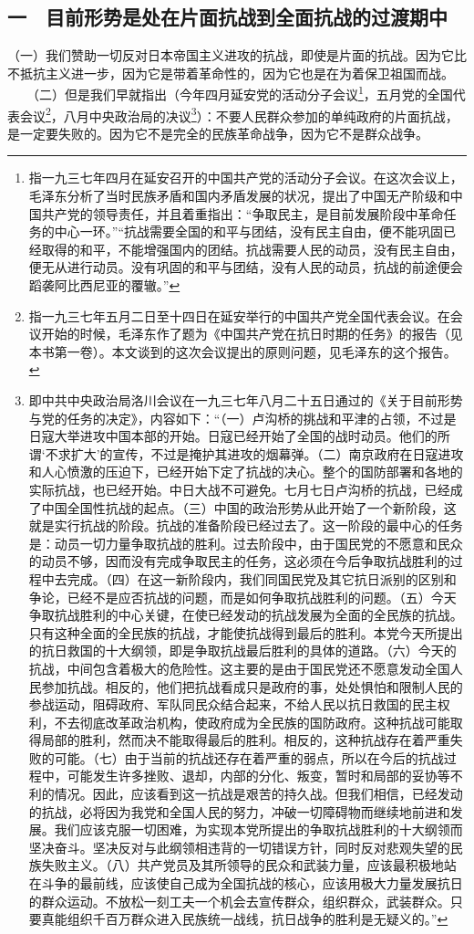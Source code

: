 \documentclass[cn,11pt,chinese]{elegantbook}
\def\myformat#1{\hfil\hfil #1}
\begin{document}
\subsection*{\myformat{一　目前形势是处在片面抗战到全面抗战的过渡期中}}
（一）我们赞助一切反对日本帝国主义进攻的抗战，即使是片面的抗战。因为它比不抵抗主义进一步，因为它是带着革命性的，因为它也是在为着保卫祖国而战。\\
　　（二）但是我们早就指出（今年四月延安党的活动分子会议\footnote[1]{ 指一九三七年四月在延安召开的中国共产党的活动分子会议。在这次会议上，毛泽东分析了当时民族矛盾和国内矛盾发展的状况，提出了中国无产阶级和中国共产党的领导责任，并且着重指出：“争取民主，是目前发展阶段中革命任务的中心一环。”“抗战需要全国的和平与团结，没有民主自由，便不能巩固已经取得的和平，不能增强国内的团结。抗战需要人民的动员，没有民主自由，便无从进行动员。没有巩固的和平与团结，没有人民的动员，抗战的前途便会蹈袭阿比西尼亚的覆辙。”}，五月党的全国代表会议\footnote[2]{ 指一九三七年五月二日至十四日在延安举行的中国共产党全国代表会议。在会议开始的时候，毛泽东作了题为《中国共产党在抗日时期的任务》的报告（见本书第一卷）。本文谈到的这次会议提出的原则问题，见毛泽东的这个报告。}，八月中央政治局的决议\footnote[3]{ 即中共中央政治局洛川会议在一九三七年八月二十五日通过的《关于目前形势与党的任务的决定》，内容如下：“（一）卢沟桥的挑战和平津的占领，不过是日寇大举进攻中国本部的开始。日寇已经开始了全国的战时动员。他们的所谓‘不求扩大’的宣传，不过是掩护其进攻的烟幕弹。（二）南京政府在日寇进攻和人心愤激的压迫下，已经开始下定了抗战的决心。整个的国防部署和各地的实际抗战，也已经开始。中日大战不可避免。七月七日卢沟桥的抗战，已经成了中国全国性抗战的起点。（三）中国的政治形势从此开始了一个新阶段，这就是实行抗战的阶段。抗战的准备阶段已经过去了。这一阶段的最中心的任务是：动员一切力量争取抗战的胜利。过去阶段中，由于国民党的不愿意和民众的动员不够，因而没有完成争取民主的任务，这必须在今后争取抗战胜利的过程中去完成。（四）在这一新阶段内，我们同国民党及其它抗日派别的区别和争论，已经不是应否抗战的问题，而是如何争取抗战胜利的问题。（五）今天争取抗战胜利的中心关键，在使已经发动的抗战发展为全面的全民族的抗战。只有这种全面的全民族的抗战，才能使抗战得到最后的胜利。本党今天所提出的抗日救国的十大纲领，即是争取抗战最后胜利的具体的道路。（六）今天的抗战，中间包含着极大的危险性。这主要的是由于国民党还不愿意发动全国人民参加抗战。相反的，他们把抗战看成只是政府的事，处处惧怕和限制人民的参战运动，阻碍政府、军队同民众结合起来，不给人民以抗日救国的民主权利，不去彻底改革政治机构，使政府成为全民族的国防政府。这种抗战可能取得局部的胜利，然而决不能取得最后的胜利。相反的，这种抗战存在着严重失败的可能。（七）由于当前的抗战还存在着严重的弱点，所以在今后的抗战过程中，可能发生许多挫败、退却，内部的分化、叛变，暂时和局部的妥协等不利的情况。因此，应该看到这一抗战是艰苦的持久战。但我们相信，已经发动的抗战，必将因为我党和全国人民的努力，冲破一切障碍物而继续地前进和发展。我们应该克服一切困难，为实现本党所提出的争取抗战胜利的十大纲领而坚决奋斗。坚决反对与此纲领相违背的一切错误方针，同时反对悲观失望的民族失败主义。（八）共产党员及其所领导的民众和武装力量，应该最积极地站在斗争的最前线，应该使自己成为全国抗战的核心，应该用极大力量发展抗日的群众运动。不放松一刻工夫一个机会去宣传群众，组织群众，武装群众。只要真能组织千百万群众进入民族统一战线，抗日战争的胜利是无疑义的。”}）：不要人民群众参加的单纯政府的片面抗战，是一定要失败的。因为它不是完全的民族革命战争，因为它不是群众战争。\\
\end{document}
